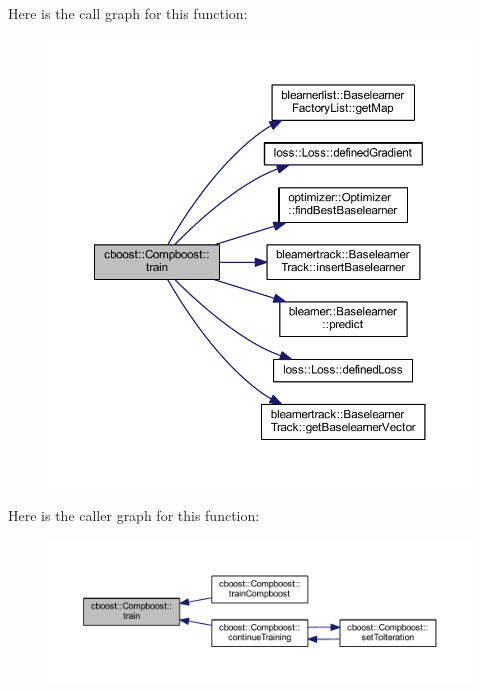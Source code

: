 Here is the call graph for this function\+:
\nopagebreak
\begin{figure}[H]
\begin{center}
\leavevmode
\includegraphics[width=350pt]{classcboost_1_1_compboost_aa898572eb2c83e0b95c12788a859333b_cgraph}
\end{center}
\end{figure}
Here is the caller graph for this function\+:
\nopagebreak
\begin{figure}[H]
\begin{center}
\leavevmode
\includegraphics[width=350pt]{classcboost_1_1_compboost_aa898572eb2c83e0b95c12788a859333b_icgraph}
\end{center}
\end{figure}
\mbox{\label{classcboost_1_1_compboost_a52ea04dec53c68865fdc4a79461d17cb}} 
